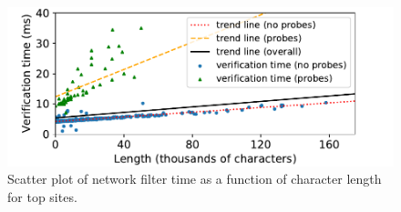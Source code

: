 \begin{figure}[h]
	\includegraphics[scale=0.5]{results/string_length_vs_verification_time_small.pdf}
	\caption{Scatter plot of network filter time as a function of character length for top sites.}
	\label{fig:verification_time_string_length}
\end{figure}

